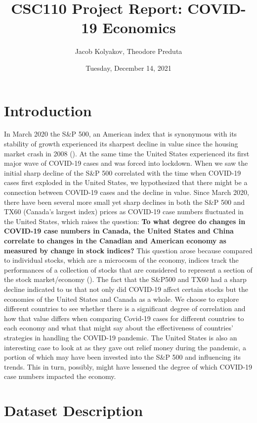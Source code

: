 \documentclass[fontsize=11pt]{article}
\title{CSC110 Project Report: COVID-19 Economics}
\author{Jacob Kolyakov, Theodore Preduta}
\date{Tuesday, December 14, 2021}
\begin{document}
\maketitle

\section*{Introduction}

In March 2020 the S\&P 500, an American index that is synonymous with its stability of growth experienced its sharpest decline in value since the housing market crash in 2008 (\cite{yahoo}).
At the same time the United States experienced its first major wave of COVID-19 cases and was forced into lockdown. 
When we saw the initial sharp decline of the S\&P 500 correlated with the time when COVID-19 cases first exploded in the United States, we hypothesized that there might be a connection between COVID-19 cases and the decline in value.
Since March 2020, there have been several more small yet sharp declines in both the S\&P 500 and TX60 (Canada's largest index) prices as COVID-19 case numbers fluctuated in the United States, which raises the question:
\textbf{To what degree do changes in COVID-19 case numbers in Canada, the United States and China correlate to changes in the Canadian and American economy as measured by change in stock indices?}
This question arose because compared to individual stocks, which are a microcosm of the economy, indices track the performances of a collection of stocks that are considered to represent a section of the stock market/economy (\cite{indexesgov}). 
The fact that the S\&P500 and TX60 had a sharp decline indicated to us that not only did COVID-19 affect certain stocks but the economies of the United States and Canada as a whole. 
We choose to explore different countries to see whether there is a significant degree of correlation and how that value differs when comparing Covid-19 cases for different countries to each economy and what that might say about the effectiveness of countries' strategies in handling the COVID-19 pandemic.
The United States is also an interesting case to look at as they gave out relief money during the pandemic, a portion of which may have been invested into the S\&P 500 and influencing its trends.
This in turn, possibly, might have lessened the degree of which COVID-19 case numbers impacted the economy.

\section*{Dataset Description}
\end{document}
